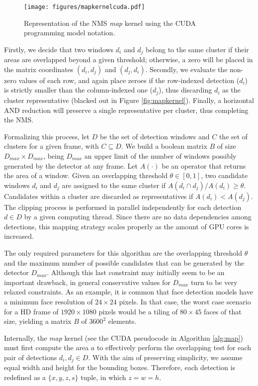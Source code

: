 \begin{figure*}[!t]
\centering
\texttt{[image: figures/mapkernelcuda.pdf]}
\caption{\label{fig:mapkernelcuda} Representation of the NMS \emph{map} kernel using the CUDA programming model notation.}
\end{figure*}

Firstly, we decide that two windows $d_i$ and $d_j$ belong to the same cluster if their 
areas are overlapped beyond a given threshold; otherwise, a zero will be placed in the matrix coordinates 
$(d_i,d_j)$ and $(d_j,d_i)$. Secondly, we evaluate the non-zero values of each row, and again place zeroes
if the row-indexed detection ($d_i$) is strictly smaller than the column-indexed one ($d_j$), thus discarding
$d_i$ as the cluster representative (blacked out in Figure \ref{fig:mapkernel}). Finally, a horizontal AND reduction 
will preserve a single representative per cluster, thus completing the NMS.

Formalizing this process, let $D$ be the set of detection windows and $C$ the set of clusters for a 
given frame, with $C\subseteq D$. We build a boolean matrix $B$ of size $D_{max}\times D_{max}$, being $D_{max}$
an upper limit of the number of windows possibly generated by the detector at any frame. Let $A(\cdot)$ be 
an operator that returns the area of a window. Given an overlapping threshold $\theta\in\left[0,1\right]$, 
two candidate windows $d_i$ and $d_j$ are assigned to the same cluster if $A(d_i\cap d_j)/A(d_i)\geq \theta$.
Candidates within a cluster are discarded as representatives if $A(d_i)<A(d_j)$. The clipping process is 
performed in parallel independently for each detection $d\in D$ by a given computing thread. Since there 
are no data dependencies among detections, this mapping strategy scales properly as the amount of GPU cores 
is increased.

The only required parameters for this algorithm are the overlapping threshold $\theta$ and the maximum number 
of possible candidates that can be generated by the detector $D_{max}$. Although this last constraint may 
initially seem to be an important drawback, in general conservative values for $D_{max}$ turn to be very 
relaxed constraints. As an example, it is common that face detection models have a minimum face resolution 
of $24\times 24$ pixels. In that case, the worst case scenario for a HD frame of $1920\times 1080$ pixels 
would be a tiling of $80\times 45$ faces of that size, yielding a matrix $B$ of $3600^2$ elements.

Internally, the \emph{map} kernel (see the CUDA pseudocode in Algorithm \ref{alg:map}) must first compute the area $a$ 
to effectively perform the overlapping test for each pair of detections $d_i, d_j \in D$. With the aim of 
preserving simplicity, we assume equal width and height for the bounding boxes. Therefore, each detection is 
redefined as a $\{x, y, z, s\}$ tuple, in which $z=w=h$.


